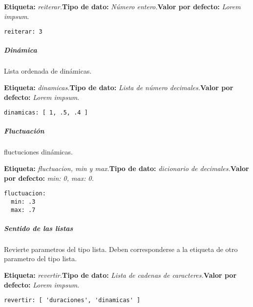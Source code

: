 \documentclass[]{article}
\let\oldsubparagraph\subparagraph
\renewcommand{\subparagraph}[1]{\oldsubparagraph{#1}\mbox{}}
\begin{document}
\textbf{Etiqueta:} \emph{reiterar.}\newline \textbf{Tipo de dato:}
\emph{Número entero.}\newline \textbf{Valor por defecto:} \emph{Lorem
impsum}.\newline

\begin{verbatim}
reiterar: 3
\end{verbatim}

\hypertarget{dinuxe1mica}{%
\subparagraph{Dinámica}\label{dinuxe1mica}}

Lista ordenada de dinámicas.

\textbf{Etiqueta:} \emph{dinamicas.}\newline \textbf{Tipo de dato:}
\emph{Lista de número decimales.}\newline \textbf{Valor por defecto:}
\emph{Lorem impsum}.\newline

\begin{verbatim}
dinamicas: [ 1, .5, .4 ]
\end{verbatim}

\hypertarget{fluctuaciuxf3n}{%
\subparagraph{Fluctuación}\label{fluctuaciuxf3n}}

fluctuciones dinámicas.

\textbf{Etiqueta:} \emph{fluctuacion, min y max.}\newline \textbf{Tipo
de dato:} \emph{dicionario de decimales.}\newline \textbf{Valor por
defecto:} \emph{min: 0, max: 0.}\newline

\begin{verbatim}
fluctuacion:
  min: .3
  max: .7
\end{verbatim}

\hypertarget{sentido-de-las-listas}{%
\subparagraph{Sentido de las listas}\label{sentido-de-las-listas}}

Revierte parametros del tipo lista. Deben corresponderse a la etiqueta
de otro parametro del tipo lista.

\textbf{Etiqueta:} \emph{revertir.}\newline \textbf{Tipo de dato:}
\emph{Lista de cadenas de caracteres.}\newline \textbf{Valor por
defecto:} \emph{Lorem impsum}.\newline

\begin{verbatim}
revertir: [ 'duraciones', 'dinamicas' ]
\end{verbatim}
\end{document}

